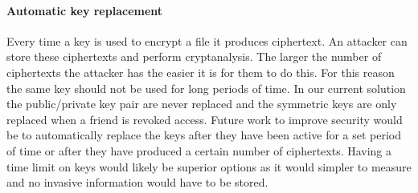 \documentclass[12pt, titlepage]{article}
\begin{document}
\paragraph*{Automatic key replacement} Every time a key is used to encrypt a file it produces ciphertext. An attacker can store these ciphertexts and perform cryptanalysis. The larger the number of ciphertexts the attacker has the easier it is for them to do this. For this reason the same key should not be used for long periods of time. In our current solution the public/private key pair are never replaced and the symmetric keys are only replaced when a friend is revoked access. Future work to improve security would be to automatically replace the keys after they have been active for a set period of time or after they have produced a certain number of ciphertexts. Having a time limit on keys would likely be superior options as it would simpler to measure and no invasive information would have to be stored.
\end{document}
